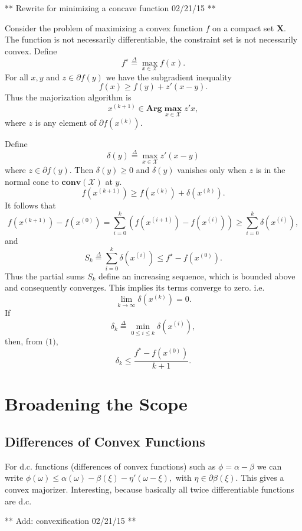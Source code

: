\documentclass[
  12pt,
]{book}
\begin{document}
** Rewrite for minimizing a concave function 02/21/15 **

Consider the problem of maximizing a convex function \(f\) on a compact set \(\mathbf{X}\). The function is not necessarily differentiable, the constraint set is not necessarily convex. Define
\[
f^\star\mathop{=}\limits^{\Delta}\max_{x\in\mathcal{X}} f(x).
\]
For all \(x,y\) and \(z\in\partial f(y)\) we have the subgradient inequality
\[
f(x)\geq f(y)+z'(x-y).
\]
Thus the majorization algorithm is
\[
x^{(k+1)}\in\mathbf{Arg}\mathop{\mathbf{max}}\limits_{x\in\mathcal{X}} z'x,
\]
where \(z\) is any element of \(\partial f(x^{(k)})\).

Define
\[
\delta(y)\mathop{=}\limits^{\Delta}\max_{x\in\mathcal{X}} z'(x-y)
\]
where \(z\in\partial f(y)\). Then \(\delta(y)\geq 0\) and \(\delta(y)\)
vanishes only when \(z\) is in the normal cone to \(\mathbf{conv}(\mathcal{X})\) at \(y\).
\[
f(x^{(k+1)})\geq f(x^{(k)})+\delta(x^{(k)}).
\]
It follows that
\[
f(x^{(k+1)})-f(x^{(0)})=\sum_{i=0}^k(f(x^{(i+1)})-f(x^{(i)}))\geq\sum_{i=0}^k\delta(x^{(i)}),
\]
and
\[
S_k\mathop{=}\limits^{\Delta}\sum_{i=0}^k\delta(x^{(i)})\leq f^\star-f(x^{(0)}).\tag{1}
\]
Thus the partial sums \(S_k\) define an increasing sequence, which is bounded above and consequently converges. This implies its terms converge to zero. i.e.
\[
\lim_{k\rightarrow\infty}\delta(x^{(k)})=0.
\]
If
\[
\delta_k\mathop{=}\limits^{\Delta}\min_{0\leq i\leq k}\delta(x^{(i)}),
\]
then, from \(\text{(1)}\),
\[
\delta_k\leq\frac{f^*-f(x^{(0)})}{k+1}.
\]

\hypertarget{broadening-the-scope}{%
\section{Broadening the Scope}\label{broadening-the-scope}}

\hypertarget{differences-of-convex-functions}{%
\subsection{Differences of Convex Functions}\label{differences-of-convex-functions}}

For d.c. functions (differences of convex functions) such as \(\phi=\alpha-\beta\) we can write
\(\phi(\omega)\leq\alpha(\omega)-\beta(\xi)-\eta'(\omega-\xi),\)
with \(\eta\in\partial\beta(\xi).\)
This gives a convex majorizer. Interesting, because basically all twice differentiable functions are d.c.

** Add: convexification 02/21/15 **
\end{document}
